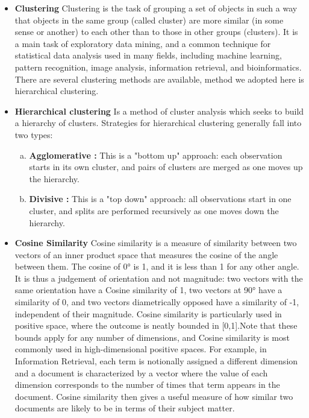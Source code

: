 \begin{itemize}
\item \textbf{Clustering} \newline
Clustering is the task of grouping a set of objects in such a way that objects in the same group (called cluster) are more similar (in some sense or another) to each other than to those in other groups (clusters). It is a main task of exploratory data mining, and a common technique for statistical data analysis used in many fields, including machine learning, pattern recognition, image analysis, information retrieval, and bioinformatics. There are several clustering methods are available,  method we adopted here is hierarchical clustering.

\item \textbf{Hierarchical clustering} \newline
Is a method of cluster analysis which seeks to build a hierarchy of clusters. Strategies for hierarchical clustering generally fall into two types:
\begin{enumerate}[a. ]
\item \textbf{Agglomerative :}  This is a "bottom up" approach: each observation starts in its own cluster, and pairs of clusters are merged as one moves up the hierarchy.
\item \textbf{Divisive :} This is a "top down" approach: all observations start in one cluster, and splits are performed recursively as one moves down the hierarchy.
\end{enumerate}

\item \textbf{Cosine Similarity} \newline
Cosine similarity is a measure of similarity between two vectors of an inner product space that measures the cosine of the angle between them. The cosine of 0° is 1, and it is less than 1 for any other angle. It is thus a judgement of orientation and not magnitude: two vectors with the same orientation have a Cosine similarity of 1, two vectors at 90° have a similarity of 0, and two vectors diametrically opposed have a similarity of -1, independent of their magnitude. Cosine similarity is particularly used in positive space, where the outcome is neatly bounded in [0,1].Note that these bounds apply for any number of dimensions, and Cosine similarity is most commonly used in high-dimensional positive spaces. For example, in Information Retrieval, each term is notionally assigned a different dimension and a document is characterized by a vector where the value of each dimension corresponds to the number of times that term appears in the document. Cosine similarity then gives a useful measure of how similar two documents are likely to be in terms of their subject matter.


\end{itemize}
